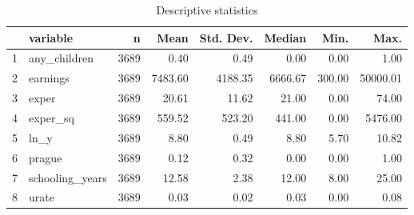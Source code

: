 \begin{table}[ht]
\centering
\caption{Descriptive statistics} 
\begin{tabular}{rlrrrrrr}
  \hline
 & variable & n & Mean & Std. Dev. & Median & Min. & Max. \\ 
  \hline
1 & any\_children & 3689 & 0.40 & 0.49 & 0.00 & 0.00 & 1.00 \\ 
  2 & earnings & 3689 & 7483.60 & 4188.35 & 6666.67 & 300.00 & 50000.01 \\ 
  3 & exper & 3689 & 20.61 & 11.62 & 21.00 & 0.00 & 74.00 \\ 
  4 & exper\_sq & 3689 & 559.52 & 523.20 & 441.00 & 0.00 & 5476.00 \\ 
  5 & ln\_y & 3689 & 8.80 & 0.49 & 8.80 & 5.70 & 10.82 \\ 
  6 & prague & 3689 & 0.12 & 0.32 & 0.00 & 0.00 & 1.00 \\ 
  7 & schooling\_years & 3689 & 12.58 & 2.38 & 12.00 & 8.00 & 25.00 \\ 
  8 & urate & 3689 & 0.03 & 0.02 & 0.03 & 0.00 & 0.08 \\ 
   \hline
\end{tabular}
\end{table}
